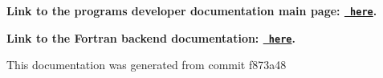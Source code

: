\label{index_md_repo_PYTHON_MAINPAGE}%
%
 {\bfseries{Link to the program\textquotesingle{}s developer documentation main page\+: \href{https://joegilkes.github.io/PX915-Docs/}{\texttt{ here}}.}}

{\bfseries{Link to the Fortran backend documentation\+: \href{https://joegilkes.github.io/PX915-Docs/fortran/docs/index.html}{\texttt{ here}}.}}

This documentation was generated from commit f873a48 